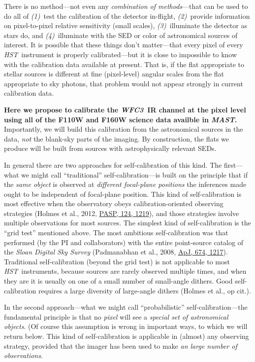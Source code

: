 \documentclass[12pt]{article}
\newcommand{\project}[1]{\textsl{#1}}
\newcommand{\HST}{\project{HST}}
\newcommand{\WFC}{\project{WFC3}}
\newcommand{\MAST}{\project{MAST}}
\begin{document}
There is no method---not even any \emph{combination of methods}---that
can be used to do all of \textsl{(1)}~test the calibration of the
detector in-flight, \textsl{(2)}~provide information on pixel-to-pixel
relative sensitivity (small scales), \textsl{(3)}~illuminate the
detector as stars do, and \textsl{(4)}~illuminate with the SED or
color of astronomical sources of interest.  It is possible that these
things don't matter---that every pixel of every \HST\ instrument is
properly calibrated---but it is close to impossible to know with the
calibration data available at present.  That is, if the flat
appropriate to stellar sources is different at fine (pixel-level)
angular scales from the flat appropriate to sky photons, that problem
would not appear strongly in current calibration data.

\textbf{Here we propose to calibrate the \WFC\ IR channel at the pixel
  level using all of the F110W and F160W science data availble in \MAST.}
Importantly, we will build this calibration from the astronomical
sources in the data, \emph{not} the blank-sky parts of the imaging.
By construction, the flats we produce will be built from sources with
astrophysically relevant SEDs.

In general there are two approaches for self-calibration of this kind.
The first---what we might call ``traditional'' self-calibration---is
built on the principle that if the \emph{same object} is observed at
\emph{different focal-plane positions} the inferences made ought to be
independent of focal-plane position.  This kind of self-calibration is
most effective when the observatory obeys calibration-oriented
observing strategies (Holmes et al., 2012,
\href{http://dx.doi.org/10.1086/668656}{PASP, 124, 1219}), and those strategies
involve multiple observations for most sources.  The simplest kind of
self-calibration is the ``grid test'' mentioned above.  The most
ambitious self-calibration was that performed (by the PI and
collaborators) with the entire point-source catalog of the
\project{Sloan Digital Sky Survey} (Padmanabhan et al., 2008,
\href{http://bit.ly/12dPkSh}{ApJ, 674, 1217}).  Traditional
self-calibration (beyond the grid test) is not applicable to most
\HST\ instruments, because sources are rarely observed multiple times,
and when they are it is usually on one of a small number of
small-angle dithers.  Good self-calibration requires a large diversity
of large-angle dithers (Holmes et al., op cit.).

In the second approach---what we might call ``probabilistic''
self-calibration---the fundamental principle is that no \emph{pixel}
will see a \emph{special set of astronomical objects}.  (Of course
this assumption is wrong in important ways, to which we will return
below.  This kind of
self-calibration is applicable in (almost) any observing strategy,
provided that the imager has been used to make \emph{an large
  number of observations}.
\end{document}

